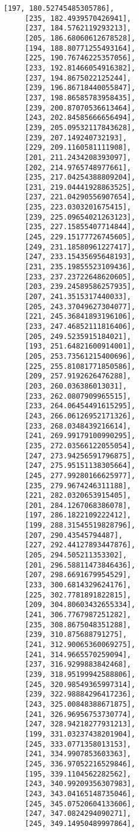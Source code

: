 \documentclass[11pt]{article}
\begin{document}
\begin{tcolorbox}[breakable, size=fbox, boxrule=.5pt, pad at break*=1mm, opacityfill=0]
\begin{Verbatim}[commandchars=\\\{\}]
     [197, 180.52745485305786],
     [235, 182.4939570426941],
     [237, 184.5762119293213],
     [205, 186.68060612678528],
     [194, 188.80771255493164],
     [225, 190.76746225357056],
     [233, 192.81466054916382],
     [237, 194.8675022125244],
     [239, 196.86718440055847],
     [237, 198.86585783958435],
     [239, 200.87070536613464],
     [243, 202.84585666656494],
     [239, 205.09532117843628],
     [239, 207.149240732193],
     [229, 209.1160581111908],
     [201, 211.2434208393097],
     [202, 214.9765748977661],
     [235, 217.04254388809204],
     [231, 219.04441928863525],
     [237, 221.04290556907654],
     [235, 223.0303201675415],
     [239, 225.09654021263123],
     [235, 227.15855407714844],
     [245, 229.15177726745605],
     [249, 231.18580961227417],
     [247, 233.15435695648193],
     [231, 235.19855523109436],
     [233, 237.23722648620605],
     [203, 239.24589586257935],
     [207, 241.3515317440033],
     [205, 243.37049627304077],
     [221, 245.36841893196106],
     [233, 247.46852111816406],
     [205, 249.5235915184021],
     [193, 251.64821600914001],
     [205, 253.73561215400696],
     [225, 255.81081771850586],
     [209, 257.9192626476288],
     [203, 260.036386013031],
     [233, 262.0807909965515],
     [233, 264.06454491615295],
     [243, 266.06126952171326],
     [233, 268.0348439216614],
     [241, 269.99179100990295],
     [235, 272.03566122055054],
     [247, 273.94256591796875],
     [247, 275.95151138305664],
     [245, 277.99280166625977],
     [235, 279.9674246311188],
     [221, 282.0320653915405],
     [201, 284.1267068386078],
     [197, 286.1822109222412],
     [199, 288.31545519828796],
     [207, 290.43545794487],
     [227, 292.44127893447876],
     [205, 294.505211353302],
     [201, 296.58811473846436],
     [207, 298.6691679954529],
     [233, 300.6814329624176],
     [225, 302.7781891822815],
     [209, 304.80603432655334],
     [241, 306.7767987251282],
     [235, 308.8675048351288],
     [239, 310.875688791275],
     [241, 312.90065360069275],
     [241, 314.9665570259094],
     [237, 316.9299883842468],
     [239, 318.95199942588806],
     [245, 320.98549365997314],
     [239, 322.98884296417236],
     [243, 325.00848388671875],
     [241, 326.96956753730774],
     [247, 328.94218277931213],
     [199, 331.03237438201904],
     [245, 333.0771358013153],
     [241, 334.9907853603363],
     [245, 336.97052216529846],
     [195, 339.1104562282562],
     [243, 340.99209356307983],
     [243, 343.04165148735046],
     [245, 345.07520604133606],
     [247, 347.0824294090271],
     [245, 349.14950489997864],

\end{Verbatim}
\end{tcolorbox}
\end{document}
